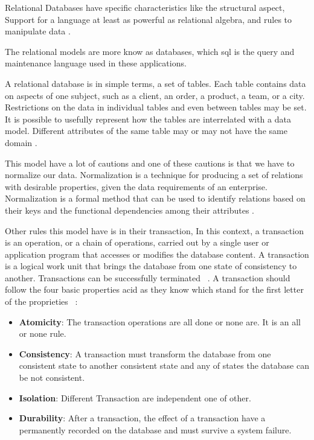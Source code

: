     Relational Databases have specific characteristics like the structural aspect, Support for a language at least as powerful as relational algebra, and rules to manipulate data \cite{10.1145/320107.320109}.
    
    The relational models are more know as  databases, which \gls{sql} is the query and maintenance language used in these applications.
    
    A relational database is in simple terms, a set of tables. Each table contains data on aspects of one subject, such as a client, an order, a product, a team, or a city. Restrictions on the data in individual tables and even between tables may be set. It is possible to usefully represent how the tables are interrelated with a data model. Different attributes of the same table may or may not have the same domain \cite{bsql}.
 
    This model have a lot of cautions and one of these cautions is that we have to normalize our data. Normalization is a technique for producing a set of relations with desirable properties, given the data requirements of an enterprise. Normalization is a formal method that can be used to identify relations based on their keys and the functional dependencies among their attributes \cite{begg}.

    Other rules this model have is in their transaction, In this context, a transaction is an operation, or a chain of operations, carried out by a single user or application program that accesses or modifies the database content. A transaction is a logical work unit that brings the database from one state of consistency to another. Transactions can be successfully terminated ~\cite{begg}.  A transaction should follow the four basic properties \gls{acid} as they know which stand for the first letter of the proprieties ~\cite{10.1145/289.291}:
\begin{itemize}
    \item \textbf{Atomicity}: The transaction operations are all done or none are. It is an all or none rule.
    \item \textbf{Consistency}: A transaction must transform the database from one consistent state to another consistent state and any of states the database can be not consistent.
    \item \textbf{Isolation}: Different Transaction are independent one of other.
    \item \textbf{Durability}: After a transaction, the effect of a transaction have a permanently recorded on the database and must survive a system failure.
\end{itemize}

